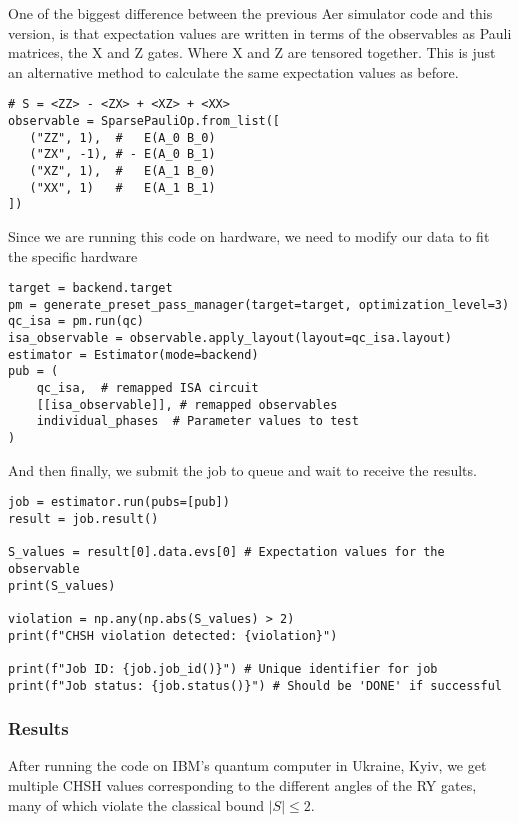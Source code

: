 \documentclass[12pt]{article}
\begin{document}
One of the biggest difference between the previous Aer simulator code and this version, is that expectation values are written in terms of the observables as Pauli matrices, the X and Z gates. Where X and Z are tensored together. This is just an alternative method to calculate the same expectation values as before.

\begin{lstlisting}[style=python]
# S = <ZZ> - <ZX> + <XZ> + <XX>
observable = SparsePauliOp.from_list([
   ("ZZ", 1),  #   E(A_0 B_0)
   ("ZX", -1), # - E(A_0 B_1)
   ("XZ", 1),  #   E(A_1 B_0)
   ("XX", 1)   #   E(A_1 B_1)
])    
\end{lstlisting}

Since we are running this code on hardware, we need to modify our data to fit the specific hardware

\begin{lstlisting}[style=python]
target = backend.target
pm = generate_preset_pass_manager(target=target, optimization_level=3)
qc_isa = pm.run(qc)
isa_observable = observable.apply_layout(layout=qc_isa.layout)
estimator = Estimator(mode=backend)
pub = (
    qc_isa,  # remapped ISA circuit
    [[isa_observable]], # remapped observables
    individual_phases  # Parameter values to test
)
\end{lstlisting}

And then finally, we submit the job to queue and wait to receive the results.

\begin{lstlisting}[style=python]
job = estimator.run(pubs=[pub])
result = job.result()

S_values = result[0].data.evs[0] # Expectation values for the observable
print(S_values)

violation = np.any(np.abs(S_values) > 2)
print(f"CHSH violation detected: {violation}")

print(f"Job ID: {job.job_id()}") # Unique identifier for job
print(f"Job status: {job.status()}") # Should be 'DONE' if successful
\end{lstlisting}

\subsubsection{Results}

After running the code on IBM's quantum computer in Ukraine, Kyiv, we get multiple CHSH values corresponding to the different angles of the RY gates, many of which violate the classical bound \( |S| \leq 2 \).
\end{document}
